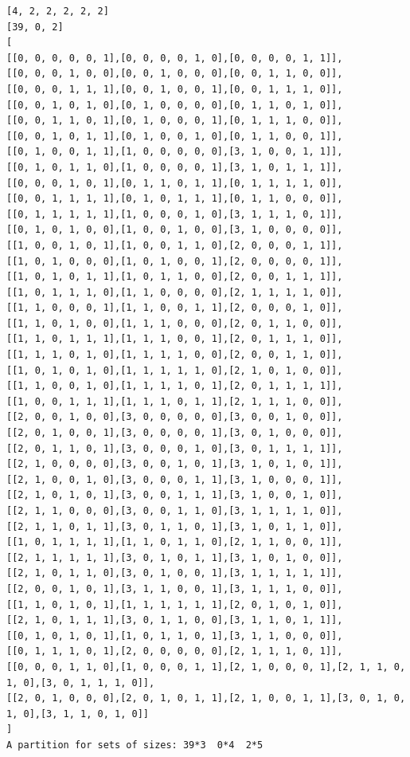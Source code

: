 \documentclass[final]{dmtcs-episciences}
\begin{document}
\begin{appendices}
\newpage

\begin{verbatim}
[4, 2, 2, 2, 2, 2]
[39, 0, 2]
[
[[0, 0, 0, 0, 0, 1],[0, 0, 0, 0, 1, 0],[0, 0, 0, 0, 1, 1]],
[[0, 0, 0, 1, 0, 0],[0, 0, 1, 0, 0, 0],[0, 0, 1, 1, 0, 0]],
[[0, 0, 0, 1, 1, 1],[0, 0, 1, 0, 0, 1],[0, 0, 1, 1, 1, 0]],
[[0, 0, 1, 0, 1, 0],[0, 1, 0, 0, 0, 0],[0, 1, 1, 0, 1, 0]],
[[0, 0, 1, 1, 0, 1],[0, 1, 0, 0, 0, 1],[0, 1, 1, 1, 0, 0]],
[[0, 0, 1, 0, 1, 1],[0, 1, 0, 0, 1, 0],[0, 1, 1, 0, 0, 1]],
[[0, 1, 0, 0, 1, 1],[1, 0, 0, 0, 0, 0],[3, 1, 0, 0, 1, 1]],
[[0, 1, 0, 1, 1, 0],[1, 0, 0, 0, 0, 1],[3, 1, 0, 1, 1, 1]],
[[0, 0, 0, 1, 0, 1],[0, 1, 1, 0, 1, 1],[0, 1, 1, 1, 1, 0]],
[[0, 0, 1, 1, 1, 1],[0, 1, 0, 1, 1, 1],[0, 1, 1, 0, 0, 0]],
[[0, 1, 1, 1, 1, 1],[1, 0, 0, 0, 1, 0],[3, 1, 1, 1, 0, 1]],
[[0, 1, 0, 1, 0, 0],[1, 0, 0, 1, 0, 0],[3, 1, 0, 0, 0, 0]],
[[1, 0, 0, 1, 0, 1],[1, 0, 0, 1, 1, 0],[2, 0, 0, 0, 1, 1]],
[[1, 0, 1, 0, 0, 0],[1, 0, 1, 0, 0, 1],[2, 0, 0, 0, 0, 1]],
[[1, 0, 1, 0, 1, 1],[1, 0, 1, 1, 0, 0],[2, 0, 0, 1, 1, 1]],
[[1, 0, 1, 1, 1, 0],[1, 1, 0, 0, 0, 0],[2, 1, 1, 1, 1, 0]],
[[1, 1, 0, 0, 0, 1],[1, 1, 0, 0, 1, 1],[2, 0, 0, 0, 1, 0]],
[[1, 1, 0, 1, 0, 0],[1, 1, 1, 0, 0, 0],[2, 0, 1, 1, 0, 0]],
[[1, 1, 0, 1, 1, 1],[1, 1, 1, 0, 0, 1],[2, 0, 1, 1, 1, 0]],
[[1, 1, 1, 0, 1, 0],[1, 1, 1, 1, 0, 0],[2, 0, 0, 1, 1, 0]],
[[1, 0, 1, 0, 1, 0],[1, 1, 1, 1, 1, 0],[2, 1, 0, 1, 0, 0]],
[[1, 1, 0, 0, 1, 0],[1, 1, 1, 1, 0, 1],[2, 0, 1, 1, 1, 1]],
[[1, 0, 0, 1, 1, 1],[1, 1, 1, 0, 1, 1],[2, 1, 1, 1, 0, 0]],
[[2, 0, 0, 1, 0, 0],[3, 0, 0, 0, 0, 0],[3, 0, 0, 1, 0, 0]],
[[2, 0, 1, 0, 0, 1],[3, 0, 0, 0, 0, 1],[3, 0, 1, 0, 0, 0]],
[[2, 0, 1, 1, 0, 1],[3, 0, 0, 0, 1, 0],[3, 0, 1, 1, 1, 1]],
[[2, 1, 0, 0, 0, 0],[3, 0, 0, 1, 0, 1],[3, 1, 0, 1, 0, 1]],
[[2, 1, 0, 0, 1, 0],[3, 0, 0, 0, 1, 1],[3, 1, 0, 0, 0, 1]],
[[2, 1, 0, 1, 0, 1],[3, 0, 0, 1, 1, 1],[3, 1, 0, 0, 1, 0]],
[[2, 1, 1, 0, 0, 0],[3, 0, 0, 1, 1, 0],[3, 1, 1, 1, 1, 0]],
[[2, 1, 1, 0, 1, 1],[3, 0, 1, 1, 0, 1],[3, 1, 0, 1, 1, 0]],
[[1, 0, 1, 1, 1, 1],[1, 1, 0, 1, 1, 0],[2, 1, 1, 0, 0, 1]],
[[2, 1, 1, 1, 1, 1],[3, 0, 1, 0, 1, 1],[3, 1, 0, 1, 0, 0]],
[[2, 1, 0, 1, 1, 0],[3, 0, 1, 0, 0, 1],[3, 1, 1, 1, 1, 1]],
[[2, 0, 0, 1, 0, 1],[3, 1, 1, 0, 0, 1],[3, 1, 1, 1, 0, 0]],
[[1, 1, 0, 1, 0, 1],[1, 1, 1, 1, 1, 1],[2, 0, 1, 0, 1, 0]],
[[2, 1, 0, 1, 1, 1],[3, 0, 1, 1, 0, 0],[3, 1, 1, 0, 1, 1]],
[[0, 1, 0, 1, 0, 1],[1, 0, 1, 1, 0, 1],[3, 1, 1, 0, 0, 0]],
[[0, 1, 1, 1, 0, 1],[2, 0, 0, 0, 0, 0],[2, 1, 1, 1, 0, 1]],
[[0, 0, 0, 1, 1, 0],[1, 0, 0, 0, 1, 1],[2, 1, 0, 0, 0, 1],[2, 1, 1, 0, 1, 0],[3, 0, 1, 1, 1, 0]],
[[2, 0, 1, 0, 0, 0],[2, 0, 1, 0, 1, 1],[2, 1, 0, 0, 1, 1],[3, 0, 1, 0, 1, 0],[3, 1, 1, 0, 1, 0]]
]
A partition for sets of sizes: 39*3  0*4  2*5
\end{verbatim}
\newpage


\end{appendices}
\end{document}
